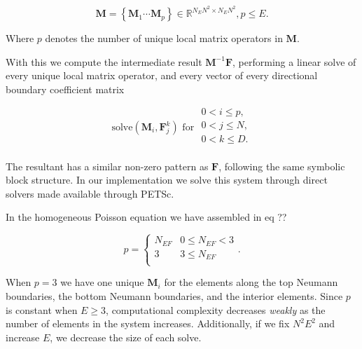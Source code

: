 \begin{equation}
	\textbf{M} = \left\{\textbf{M}_1 \cdots \textbf{M}_p\right\} \in \mathbb{R}^{N_{E}N^2 \times N_{E}N^2}, p \leq E.
\end{equation} 

\noindent 
Where $p$ denotes the number of unique local matrix operators in $\textbf{M}$. 

With this we compute the intermediate result $\textbf{M}^{-1}\textbf{F}$, performing a linear solve of every unique local matrix operator, and every vector of every directional boundary coefficient matrix 

\begin{equation}
	\text{solve}(\textbf{M}_{i}, \textbf{F}^{k}_j) \text{  for }
	\begin{array}{l}
		0 < i \leq p, \\
		0 < j \leq N, \\
		0 < k \leq D. \\ 
	\end{array}
\end{equation}

\noindent
The resultant has a similar non-zero pattern as $\textbf{F}$, following the same symbolic block structure. In our implementation we solve this system through direct solvers made available through PETSc. 

\begin{aside}
	In the homogeneous Poisson equation we have assembled in 
	eq {\color{red} ?? } 

	\begin{equation}
		p = \begin{cases}
		    N_{EF} &  0 \leq N_{EF} < 3 \\ 
			3 &  3 \leq N_{EF} \\ 
		\end{cases}.
	\end{equation} 

	\noindent 
	When $p = 3$ we have one unique $\textbf{M}_i$ for the elements 
	along the top Neumann boundaries, the bottom Neumann boundaries, 
	and the interior elements. Since $p$ is constant when 
	$E \geq 3$, computational complexity decreases \emph{weakly} 
	as the number of elements in the system increases. Additionally, 
	if we fix $N^2E^2$ and increase $E$, we decrease the size of 
	each solve.
\end{aside}

